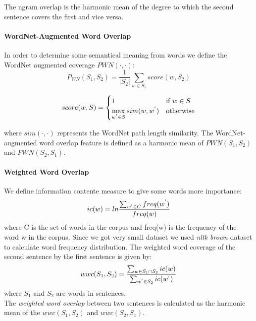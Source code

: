 \documentclass[10pt, a4paper]{article}
\begin{document}
The ngram overlap is the harmonic mean of the degree
to which the second sentence covers the first
and vice versa.\citep{Saric2012TakeLabSF}

\paragraph{WordNet-Augmented Word Overlap \\}
In order to determine some semantical meaning from words we define the WordNet augmented coverage $ PWN(\cdot, \cdot) $:
\begin{equation}\label{eq:pwn}
P_{WN}(S_1, S_2) = \frac{1}{|S_2|} \sum_{w \in S_1} score(w, S_2)
\end{equation}

\begin{equation}\label{eq:pwn-score}
score(w, S) = \begin{cases}
1 & \text{if $w \in S $}\\
\max\limits_{w^{\rq} \in S} sim(w, w^{\rq}) & \text{otherwise}
\end{cases}
\end{equation}

where $sim(\cdot, \cdot)$ represents the WordNet path length
similarity. The WordNet-augmented word overlap
feature is defined as a harmonic mean of
$PWN(S_1, S_2)$ and $PWN(S_2, S_1)$.\citep{Saric2012TakeLabSF}


\paragraph{Weighted Word Overlap \\}
We define information contente measure to give some words more importance:
\begin{equation}\label{eq:inf-content}
ic(w) = ln \frac{\sum_{w^{\rq} \in C} freq(w^{\rq}) }{freq(w)}
\end{equation}
where C is the set of words in the corpus and
freq(w) is the frequency of the word w in the corpus. Since we got very small dataset we used \emph{nltk brown} dataset to calculate word frequency distribution.
The weighted word coverage of the second sentence by the first sentence is given by:
\begin{equation}\label{eq:wwc}
wwc(S_1, S_2) = \frac{\sum_{w \in S_1 \cap S_2} ic(w)}{\sum_{w^{\rq} \in S_2} ic(w^{\rq})}
\end{equation}
where $S_1$ and $S_2$ are words in sentences.\\
The \emph{weighted word overlap} between two sentences
is calculated as the harmonic mean of the
$wwc(S_1, S_2)$ and $wwc(S_2, S_1)$.\citep{Saric2012TakeLabSF}
\end{document}
